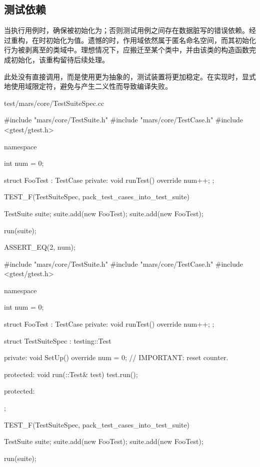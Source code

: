 \begin{content}
\subsection{测试依赖}

当执行用例时，确保被初始化为；否则测试用例之间存在数据脏写的错误依赖。经过重构，在时初始化为值。遗憾的时，作用域依然属于匿名命名空间，而其初始化行为被剥离至的类域中。理想情况下，应搬迁至某个类中，并由该类的构造函数完成初始化，该重构留待后续处理。

此处没有直接调用，而是使用更为抽象的，测试装置将更加稳定。在实现时，显式地使用域限定符，避免与产生二义性而导致编译失败。

\begin{diff}{test/mars/core/TestSuiteSpec.cc}
 \begin{minicpp}
#include "mars/core/TestSuite.h"
#include "mars/core/TestCase.h"
#include <gtest/gtest.h>

namespace {
  int num = 0;

  struct FooTest : TestCase {
  private:
    void runTest() override {
      num++;
    }
  };
}

TEST_F(TestSuiteSpec, pack_test_cases_into_test_suite) {
  TestSuite suite;
  suite.add(new FooTest);
  suite.add(new FooTest);

  run(suite);

  ASSERT_EQ(2, num);
}
 \end{minicpp}
\tcblower
 \begin{minicpp}
#include "mars/core/TestSuite.h"
#include "mars/core/TestCase.h"
#include <gtest/gtest.h>

namespace {
  int num = 0;

  struct FooTest : TestCase {
  private:
    void runTest() override {
      num++;
    }
  };

  struct TestSuiteSpec : testing::Test {
  private:
    void SetUp() override {
      num = 0;  // IMPORTANT: reset counter.
    }

  protected:
    void run(::Test& test) {
      test.run();
    }

  protected:
  };
}

TEST_F(TestSuiteSpec, pack_test_cases_into_test_suite) {
  TestSuite suite;
  suite.add(new FooTest);
  suite.add(new FooTest);

  run(suite);

}
\end{minicpp}
\end{diff}
\end{content}
